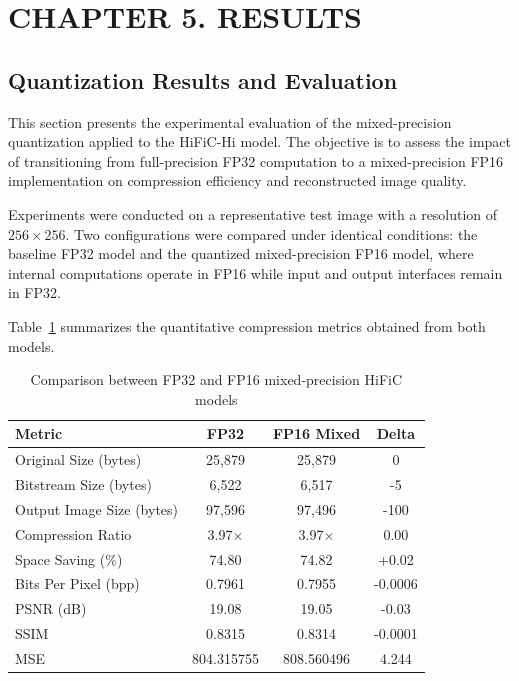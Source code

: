 \newpage
\section*{CHAPTER 5. RESULTS}
\setcounter{section}{5}
\setcounter{subsection}{0}
\setcounter{subsubsection}{0}
\setcounter{paragraph}{0}
\setcounter{figure}{0}
\setcounter{table}{0}






\subsection{Quantization Results and Evaluation}

This section presents the experimental evaluation of the mixed-precision quantization applied to the HiFiC-Hi model. The objective is to assess the impact of transitioning from full-precision FP32 computation to a mixed-precision FP16 implementation on compression efficiency and reconstructed image quality.

Experiments were conducted on a representative test image with a resolution of $256 \times 256$. Two configurations were compared under identical conditions: the baseline FP32 model and the quantized mixed-precision FP16 model, where internal computations operate in FP16 while input and output interfaces remain in FP32.

Table~\ref{tab:quant_results} summarizes the quantitative compression metrics obtained from both models.

\begin{table}[H]
\centering
\caption{Comparison between FP32 and FP16 mixed-precision HiFiC models}
\label{tab:quant_results}
\begin{tabular}{|l|c|c|c|}
\hline
\textbf{Metric} & \textbf{FP32} & \textbf{FP16 Mixed} & \textbf{Delta} \\
\hline
Original Size (bytes) & 25,879 & 25,879 & 0 \\
Bitstream Size (bytes) & 6,522 & 6,517 & -5 \\
Output Image Size (bytes) & 97,596 & 97,496 & -100 \\
Compression Ratio & 3.97$\times$ & 3.97$\times$ & 0.00 \\
Space Saving (\%) & 74.80 & 74.82 & +0.02 \\
Bits Per Pixel (bpp) & 0.7961 & 0.7955 & -0.0006 \\
PSNR (dB) & 19.08 & 19.05 & -0.03 \\
SSIM & 0.8315 & 0.8314 & -0.0001 \\
MSE  &  804.315755 & 808.560496 & 4.244 \\
\hline
\end{tabular}
\end{table}

